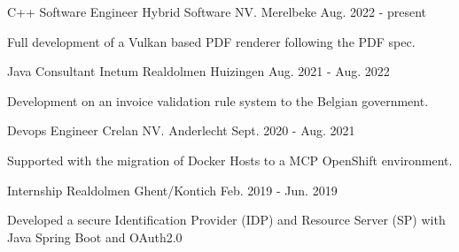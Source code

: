

\begin{cventries}

  \cvlistentry
    {C++ Software Engineer} %
    {Hybrid Software NV.} %
    {Merelbeke} %
    {Aug. 2022 - present} %
    {
      \begin{cvitems} %
		  \item{Full development of a Vulkan based PDF renderer following the PDF spec.}
      \end{cvitems}
  	}

  \cvlistentry
    {Java Consultant} %
    {Inetum Realdolmen} %
    {Huizingen} %
    {Aug. 2021 - Aug. 2022} %
    {
      \begin{cvitems} %
	    \item {Development on an invoice validation rule system to the Belgian government.}
      \end{cvitems}
  	}

  \cvlistentry
    {Devops Engineer} %
    {Crelan NV.} %
    {Anderlecht} %
    {Sept. 2020 - Aug. 2021} %
    {
      \begin{cvitems} %
	    \item {Supported with the migration of Docker Hosts to a MCP OpenShift environment.}
      \end{cvitems}
  	}

  \cvlistentry
    {Internship} %
    {Realdolmen} %
    {Ghent/Kontich} %
    {Feb. 2019 - Jun. 2019} %
    {
      \begin{cvitems} %
	    \item {Developed a secure Identification Provider (IDP) and Resource Server (SP) with Java Spring Boot and OAuth2.0}
      \end{cvitems}
    }

\end{cventries}
